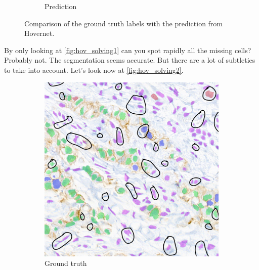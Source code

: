 \begin{figure}[H]
\begin{subfigure}{0.45\textwidth}
      \caption{Prediction}
    \end{subfigure}
    \caption{Comparison of the ground truth labels with the prediction from Hovernet.}
    \label{fig:hov_solving1}
\end{figure}

By only looking at \autoref{fig:hov_solving1} can you spot rapidly all the missing cells? Probably not. The segmentation seems accurate. But there are a lot of subtleties to take into account. Let's look now at \autoref{fig:hov_solving2}.


\begin{figure}[H]
    \centering
    \begin{subfigure}{0.45\textwidth}
      \centering
      \includegraphics[width=\textwidth]{imgs/scaling/GT.png}
      \caption{Ground truth}
    \end{subfigure}
    \hfill
    \begin{subfigure}{0.45\textwidth}
      \centering

\end{subfigure}
\end{figure}
